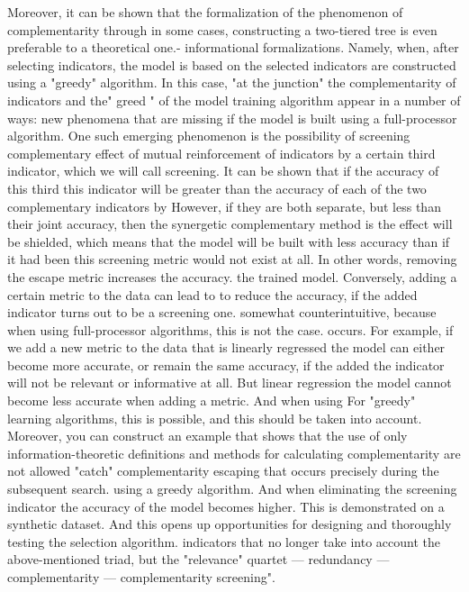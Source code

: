 \documentclass[12pt]{a&t}
\begin{document}
Moreover, it can be shown that the formalization of the phenomenon of complementarity through
in some cases, constructing a two-tiered tree is even preferable to a theoretical one.-
informational formalizations. Namely, when, after selecting indicators, the model is based on
the selected indicators are constructed using a "greedy" algorithm. In this case, "at the junction"
the complementarity of indicators and the" greed " of the model training algorithm appear in a number of ways:
new phenomena that are missing if the model is built using a full-processor algorithm.
One such emerging phenomenon is the possibility of screening
complementary effect of mutual reinforcement of indicators by a certain third indicator,
which we will call screening. It can be shown that if the accuracy of this third
this indicator will be greater than the accuracy of each of the two complementary indicators by
However, if they are both separate, but less than their joint accuracy, then the synergetic complementary method is
the effect will be shielded, which means that the model will be built with less accuracy than if it had been
this screening metric would not exist at all.
In other words, removing the escape metric increases the accuracy.
the trained model. Conversely, adding a certain metric to the data can lead to
to reduce the accuracy, if the added indicator turns out to be a screening one.
somewhat counterintuitive, because when using full-processor algorithms, this is not the case.
occurs. For example, if we add a new metric to the data that is linearly regressed
the model can either become more accurate, or remain the same accuracy, if the added
the indicator will not be relevant or informative at all. But linear regression
the model cannot become less accurate when adding a metric. And when using
For "greedy" learning algorithms, this is possible, and this should be taken into account.
Moreover, you can construct an example that shows that the use of only
information-theoretic definitions and methods for calculating complementarity are not allowed
"catch" complementarity escaping that occurs precisely during the subsequent search.
using a greedy algorithm. And when eliminating the screening indicator
the accuracy of the model becomes higher. This is demonstrated on a synthetic dataset. And
this opens up opportunities for designing and thoroughly testing the selection algorithm.
indicators that no longer take into account the above-mentioned triad, but the "relevance" quartet —
redundancy — complementarity — complementarity screening".
\end{document}
